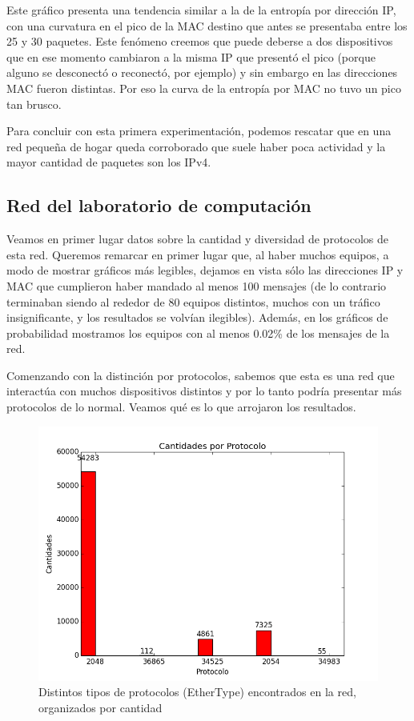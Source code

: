 Este gr\'afico presenta una tendencia similar a la de la entrop\'ia por direcci\'on IP, con una curvatura en el pico de la MAC destino que antes se presentaba entre los 25 y 30 paquetes. Este fen\'omeno creemos que puede deberse a dos dispositivos que en ese momento cambiaron a la misma IP que present\'o el pico (porque alguno se desconect\'o o reconect\'o, por ejemplo) y sin embargo en las direcciones MAC fueron distintas. Por eso la curva de la entrop\'ia por MAC no tuvo un pico tan brusco.\newline

Para concluir con esta primera experimentaci\'on, podemos rescatar que en una red peque\~na de hogar queda corroborado que suele haber poca actividad y la mayor cantidad de paquetes son los IPv4.


\newpage

\subsection{Red del laboratorio de computaci\'on}

Veamos en primer lugar datos sobre la cantidad y diversidad de protocolos de esta red. Queremos remarcar en primer lugar que, al haber muchos equipos, a modo de mostrar gr\'aficos m\'as legibles, dejamos en vista s\'olo las direcciones IP y MAC que cumplieron haber mandado al menos 100 mensajes (de lo contrario terminaban siendo al rededor de 80 equipos distintos, muchos con un tr\'afico insignificante, y los resultados se volv\'ian ilegibles). Adem\'as, en los gr\'aficos de probabilidad mostramos los equipos con al menos 0.02\% de los mensajes de la red.\newline

Comenzando con la distinci\'on por protocolos, sabemos que esta es una red que interact\'ua con muchos dispositivos distintos y por lo tanto podr\'ia presentar m\'as protocolos de lo normal. Veamos qu\'e es lo que arrojaron los resultados.

\begin{figure}[h!]
\centering
\includegraphics[width=0.7\linewidth]{imagenes/exp2/1cantidadProtocolo}
\caption{Distintos tipos de protocolos (EtherType) encontrados en la red, organizados por cantidad}
\label{exp1grafico1}
\end{figure}

